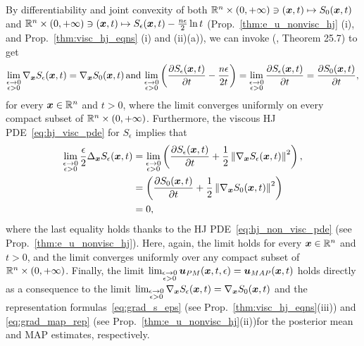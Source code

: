 By differentiability and joint convexity of both $\mathbb{R}^n \times (0,+\infty) \ni (\boldsymbol{x},t) \mapsto S_0(\boldsymbol{x},t)$ and $\mathbb{R}^n \times (0,+\infty) \ni (\boldsymbol{x},t)\mapsto S_{\epsilon}(\boldsymbol{x},t)-\frac{n\epsilon}{2}\ln t$ (Prop.~\ref{thm:e_u_nonvisc_hj} (i), and Prop.~\ref{thm:visc_hj_eqns} (i) and (ii)(a)), we can invoke (\citep{rockafellar1970convex}, Theorem 25.7) to get 
\[
\lim_{\substack{\epsilon\to0\\\epsilon>0}}\nabla_{\boldsymbol{x}}S_{\epsilon}(\boldsymbol{x},t)=\nabla_{\boldsymbol{x}}S_0(\boldsymbol{x},t)\,\mbox{and}\,\lim_{\substack{\epsilon\to0\\\epsilon>0}}\left(\frac{\partial S_{\epsilon}(\boldsymbol{x},t)}{\partial t}-\frac{n\epsilon}{2t}\right)=\lim_{\substack{\epsilon\to0\\
\epsilon>0}}\frac{\partial S_{\epsilon}(\boldsymbol{x},t)}{\partial t}=\frac{\partial S_0(\boldsymbol{x},t)}{\partial t},
\]
for every $\boldsymbol{x}\in\mathbb{R}^n$ and $t>0$, where the limit converges uniformly on every compact subset of $\mathbb{R}^n\times(0,+\infty)$. Furthermore, the viscous HJ PDE~\eqref{eq:hj_visc_pde} for $S_\epsilon$ implies that
\begin{align*}
\lim_{\substack{\epsilon\to0\\
\epsilon>0
}
}\frac{\epsilon}{2}\Delta_{\boldsymbol x} S_{\epsilon}(\boldsymbol{x},t) & =\lim_{\substack{\epsilon\to0\\
\epsilon>0
}
}\left(\frac{\partial S_{\epsilon}(\boldsymbol{x},t)}{\partial t}+\frac{1}{2}\left\Vert \nabla_{\boldsymbol{x}}S_{\epsilon}(\boldsymbol{x},t)\right\Vert ^{2}\right),\\
 & =\left(\frac{\partial S_{0}(\boldsymbol{x},t)}{\partial t}+\frac{1}{2}\left\Vert \nabla_{\boldsymbol{x}}S_0(\boldsymbol{x},t)\right\Vert ^{2}\right)\\
 & =0,
\end{align*}
where the last equality holds thanks to the HJ PDE~\eqref{eq:hj_non_visc_pde} (see Prop.~\ref{thm:e_u_nonvisc_hj}). Here, again, the limit holds for every $\boldsymbol{x}\in\mathbb{R}^n$ and $t>0$, and the limit converges uniformly over any compact subset of $\mathbb{R}^n\times(0,+\infty)$. Finally, the limit $\lim_{\substack{\epsilon\to0\\\epsilon>0}} \boldsymbol{u}_{PM}(\boldsymbol{x},t,\epsilon) = \boldsymbol{u}_{MAP}(\boldsymbol{x},t)$ holds directly as a consequence to the limit $\lim_{\substack{\epsilon\to0\\\epsilon>0}}\nabla_{\boldsymbol{x}}S_{\epsilon}(\boldsymbol{x},t)=\nabla_{\boldsymbol{x}}S_0(\boldsymbol{x},t)$ and the representation formulas~\eqref{eq:grad_s_eps} (see Prop.~\ref{thm:visc_hj_eqns}(iii)) and \eqref{eq:grad_map_rep} (see Prop.~\ref{thm:e_u_nonvisc_hj}(ii))for the posterior mean and MAP estimates, respectively.